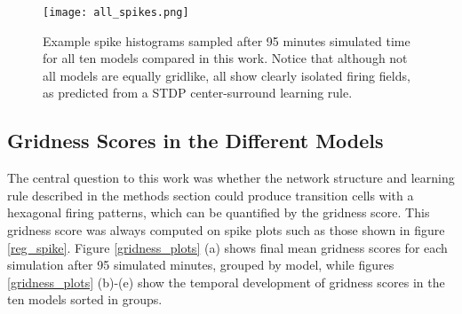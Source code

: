 \documentclass{article}
\begin{document}
    \begin{figure}[H]
        \centering
        \texttt{[image: all\_spikes.png]}
        \caption{Example spike histograms sampled after 95 minutes simulated time for all ten models compared in this work. Notice that although not all models are equally gridlike, all show clearly isolated firing fields, as predicted from a STDP center-surround learning rule.}
        \label{all_spikes}
    \end{figure}

    \subsection{Gridness Scores in the Different Models} \label{Gscore}
    
    The central question to this work was whether the network structure and learning rule described in the methods section could produce transition cells with a hexagonal firing patterns, which can be quantified by the gridness score. This gridness score was always computed on spike plots such as those shown in figure \ref{reg_spike}. Figure \ref{gridness_plots} (a) shows final mean gridness scores for each simulation after 95 simulated minutes, grouped by model, while figures \ref{gridness_plots} (b)-(e) show the temporal development of gridness scores in the ten models sorted in groups.
    
\end{document}
